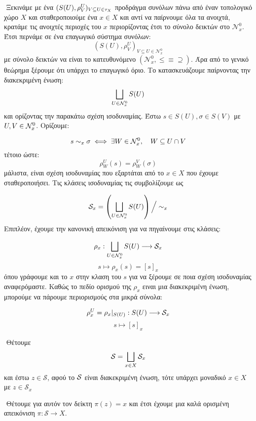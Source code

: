\vspace*{0.3cm}

$ $\newline
Ξεκινάμε με ένα $(S(U),\rho^U_V)_{V\subseteq U\in \tau_X}$ προδράγμα συνόλων πάνω από έναν τοπολογικό χώρο $X$ και σταθεροποιούμε ένα $x \in X$ και αντί να παίρνουμε όλα τα ανοιχτά, κρατάμε τις ανοιχτές περιοχές του $x$ περιορίζοντας έτσι το σύνολο δεικτών στο $\mathcal{N}^0_x$. Έτσι περνάμε σε ένα επαγωγικό σύστημα συνόλων: 
$$(S(U),\rho^U_V)_{V\subseteq U \in \mathcal{N}^0_x}$$ με σύνολο δεικτών να είναι το κατευθυνόμενο $(\mathcal{N}^0_x, \leq \equiv \supseteq)$. Άρα από το γενικό θεώρημα ξέρουμε ότι υπάρχει το επαγωγικό όριο. Το κατασκευάζουμε παίρνοντας την διακεκριμένη ένωση:
$$\bigsqcup\limits_{U \in \mathcal{N}^0_x} S(U)$$ και ορίζοντας την παρακάτω σχέση ισοδυναμίας. Έστω $s \in S(U),\sigma \in S(V)$ με $U,V \in \mathcal{N}^0_x$. Ορίζουμε:

$$s \sim_{x} \sigma \iff \exists W \in \mathcal{N}^0_x, \quad W \subseteq U\cap V$$ τέτοιο ώστε:
$$\rho^U_W(s) = \rho^V_W (\sigma)$$ μάλιστα, είναι σχέση ισοδυναμίας που εξαρτάται από το $x \in X$ που έχουμε σταθεροποιήσει. Τις κλάσεις ισοδυναμίας τις συμβολίζουμε ως

$$\mathcal{S}_x = \left(\bigsqcup\limits_{U \in \mathcal{N}^0_x} S(U) \right)\Big/ \sim_x$$ Επιπλέον, έχουμε την κανονική απεικόνιση για να πηγαίνουμε στις κλάσεις:

$$\rho_x : \bigsqcup\limits_{U \in \mathcal{N}^0_x} S(U) \longrightarrow \mathcal{S}_x$$
$$s \longmapsto \rho_x(s) = [s]_x$$ όπου γράφουμε και το $x$ στην κλαση του $s$ για να ξέρουμε σε ποια σχέση ισοδυναμίας αναφερόμαστε. Καθώς το πεδίο ορισμού της $\rho_x$ ειναι μια διακεκριμένη ένωση, μπορούμε να πάρουμε περιορισμούς στα μικρά σύνολα:





$$\rho^U_x = \rho_x|_{S(U)} : S(U)\longrightarrow \mathcal{S}_x$$
$$s\longmapsto [s]_x$$

$ $\newline
Θέτουμε
$$\mathcal{S}  = \bigsqcup\limits_{x \in X} \mathcal{S}_x$$
και έστω $z \in \mathcal{S}$, αφού το $\mathcal{S}$ είναι διακεκριμένη ένωση, τότε υπάρχει μοναδικό $x \in X$ με $z \in \mathcal{S}_x$

$ $\newline
Θέτουμε για αυτόν τον δείκτη $\pi(z) = x$ και έτσι έχουμε μια καλά ορισμένη απεικόνιση $\pi:\mathcal{S}\rightarrow X$.

